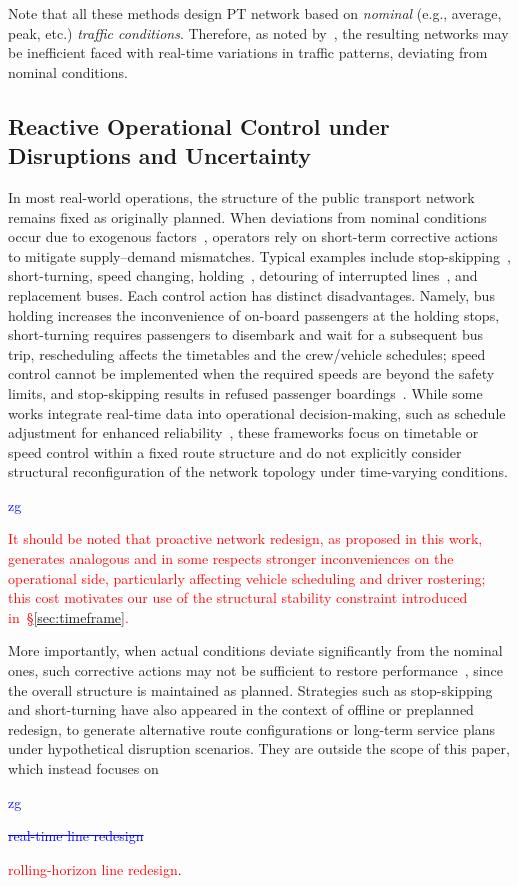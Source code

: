 \documentclass[a4paper,fleqn]{cas-sc}
\newcommand{\stkout}[1]{\ifmmode\text{\sout{\ensuremath{#1}}}\else\sout{#1}\fi}
\newcommand\rev[3]{\textcolor{blue}{\begin{scriptsize}{#1}\end{scriptsize}\stkout{#2}}\textcolor{red}{#3}}
\newcommand\rev[3]{\ignorespaces#3\ignorespaces\unskip}
\begin{document}
Note that all these methods design PT network based on \emph{nominal} (e.g., average, peak, etc.) \emph{traffic conditions}.
Therefore, as noted by~\citep{tan2024optimizing}, the resulting networks may be inefficient faced with real-time variations in traffic patterns, deviating from nominal conditions. 

\subsection{Reactive Operational Control under Disruptions and Uncertainty}
\label{sec:reactive}

In most real-world operations, the structure of the public transport network remains fixed as originally planned. 
When deviations from nominal conditions occur due to exogenous factors~\citep{nissen2020does, chen2009analyzing}, 
operators rely on short-term corrective actions to mitigate supply--demand mismatches.
Typical examples include stop-skipping~\citep{peled2021quality}, short-turning, 
speed changing, holding~\citep{tang2018optimal, manasra2019optimization, gkiotsalitis2020public, olvera2023holding}, 
detouring of interrupted lines~\citep{zheng2023multi}, and replacement buses.
Each control action has distinct disadvantages.
Namely, bus holding increases the inconvenience of on-board passengers at the holding stops, short-turning requires passengers to disembark and wait for a subsequent bus trip, rescheduling affects the timetables and the crew/vehicle schedules; speed control cannot be implemented when the required speeds are beyond the safety limits, and stop-skipping results in refused passenger boardings~\citep{gkiotsalitis2021stop}.
While some works integrate real-time data into operational decision-making, such as schedule adjustment for enhanced reliability~\citep{cao2019real}, these frameworks focus on timetable or speed control within a fixed route structure and do not explicitly consider structural reconfiguration of the network topology under time-varying conditions.
\rev{zg}{}{It should be noted that proactive network redesign, as proposed in this work, generates analogous and in some respects stronger inconveniences on the operational side, particularly affecting vehicle scheduling and driver rostering; this cost motivates our use of the structural stability constraint introduced in~\S{}\ref{sec:timeframe}.}

More importantly, when actual conditions deviate significantly from the nominal ones, such corrective actions may not be sufficient to restore performance~\citep{guo2024restoring}, since the overall structure is maintained as planned.
%
Strategies such as stop-skipping and short-turning have also appeared in the context of offline or preplanned redesign, to generate alternative route configurations or long-term service plans under hypothetical disruption scenarios. They are outside the scope of this paper, which instead focuses on \rev{zg}{real-time line redesign}{rolling-horizon line redesign}.
\end{document}
